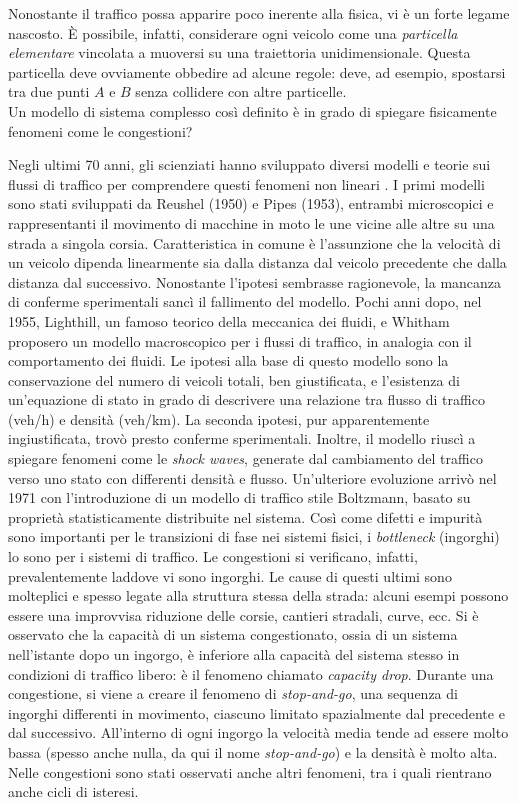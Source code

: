 \documentclass[../main.tex]{subfiles}
\begin{document}
Nonostante il traffico possa apparire poco inerente alla fisica, vi \`e un forte legame nascosto.
\`E possibile, infatti, considerare ogni veicolo come una \emph{particella elementare} vincolata a muoversi su una traiettoria unidimensionale.
Questa particella deve ovviamente obbedire ad alcune regole: deve, ad esempio, spostarsi tra due punti $A$ e $B$ senza collidere con altre particelle.\\
Un modello di sistema complesso cos\`i definito \`e in grado di spiegare fisicamente fenomeni come le congestioni?

Negli ultimi 70 anni, gli scienziati hanno sviluppato diversi modelli e teorie sui flussi di traffico per comprendere questi fenomeni non lineari \cite{bs2004physics}.
I primi modelli sono stati sviluppati da Reushel (1950) e Pipes (1953), entrambi microscopici e rappresentanti il movimento di macchine in moto le une vicine alle altre su una strada a singola corsia.
Caratteristica in comune \`e l'assunzione che la velocit\`a di un veicolo dipenda linearmente sia dalla distanza dal veicolo precedente che dalla distanza dal successivo.
Nonostante l'ipotesi sembrasse ragionevole, la mancanza di conferme sperimentali sanc\`i il fallimento del modello.
Pochi anni dopo, nel 1955, Lighthill, un famoso teorico della meccanica dei fluidi, e Whitham proposero un modello macroscopico per i flussi di traffico, in analogia con il comportamento dei fluidi.
Le ipotesi alla base di questo modello sono la conservazione del numero di veicoli totali, ben giustificata, e l'esistenza di un'equazione di stato in grado di descrivere una relazione tra flusso di traffico (veh/h) e densit\`a (veh/km).
La seconda ipotesi, pur apparentemente ingiustificata, trov\`o presto conferme sperimentali.
Inoltre, il modello riusc\`i a spiegare fenomeni come le \emph{shock waves}, generate dal cambiamento del traffico verso uno stato con differenti densit\`a e flusso.
Un'ulteriore evoluzione arriv\`o nel 1971 con l'introduzione di un modello di traffico stile Boltzmann, basato su propriet\`a statisticamente distribuite nel sistema.
Cos\`i come difetti e impurit\`a sono importanti per le transizioni di fase nei sistemi fisici, i \emph{bottleneck} (ingorghi) lo sono per i sistemi di traffico.
Le congestioni si verificano, infatti, prevalentemente laddove vi sono ingorghi.
Le cause di questi ultimi sono molteplici e spesso legate alla struttura stessa della strada: alcuni esempi possono essere una improvvisa riduzione delle corsie, cantieri stradali, curve, ecc.
Si \`e osservato che la capacit\`a di un sistema congestionato, ossia di un sistema nell'istante dopo un ingorgo, \`e inferiore alla capacit\`a del sistema stesso in condizioni di traffico libero: \`e il fenomeno chiamato \emph{capacity drop}.
Durante una congestione, si viene a creare il fenomeno di \emph{stop-and-go}, una sequenza di ingorghi differenti in movimento, ciascuno limitato spazialmente dal precedente e dal successivo.
All'interno di ogni ingorgo la velocit\`a media tende ad essere molto bassa (spesso anche nulla, da qui il nome \emph{stop-and-go}) e la densit\`a \`e molto alta.
Nelle congestioni sono stati osservati anche altri fenomeni, tra i quali rientrano anche cicli di isteresi.
\end{document}
